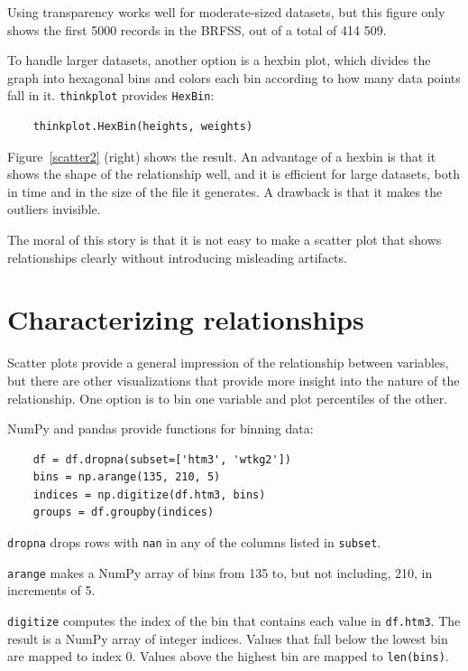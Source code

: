 \documentclass[12pt]{book}
\begin{document}
Using transparency works well for moderate-sized datasets, but this
figure only shows the first 5000 records in the BRFSS, out of a total
of 414 509.

To handle larger datasets, another option is a hexbin plot, which
divides the graph into hexagonal bins and colors each bin according to
how many data points fall in it.  {\tt thinkplot} provides 
{\tt HexBin}:
%
\begin{verbatim}
    thinkplot.HexBin(heights, weights)
\end{verbatim}
%
Figure~\ref{scatter2} (right) shows the result.  An advantage of a
hexbin is that it shows the shape of the relationship well, and it is
efficient for large datasets, both in time and in the size of the file
it generates.  A drawback is that it makes the outliers invisible.

The moral of this story is that it is
not easy to make a scatter plot that shows relationships clearly
without introducing misleading artifacts.


\section{Characterizing relationships}
\label{characterizing}

Scatter plots provide a general impression of the relationship between
variables, but there are other visualizations that provide more
insight into the nature of the relationship.  One option is to bin one
variable and plot percentiles of the other.

NumPy and pandas provide functions for binning data:

\begin{verbatim}
    df = df.dropna(subset=['htm3', 'wtkg2'])
    bins = np.arange(135, 210, 5)
    indices = np.digitize(df.htm3, bins)
    groups = df.groupby(indices)
\end{verbatim}

{\tt dropna} drops rows with {\tt nan} in any of the columns
listed in {\tt subset}.

{\tt arange} makes a NumPy array of bins from 135 to, but not including,
210, in increments of 5.

{\tt digitize} computes the index of the bin that contains each value
in {\tt df.htm3}.  The result is a NumPy array of integer indices.
Values that fall below the lowest bin are mapped to index 0.  Values
above the highest bin are mapped to {\tt len(bins)}.
\end{document}
